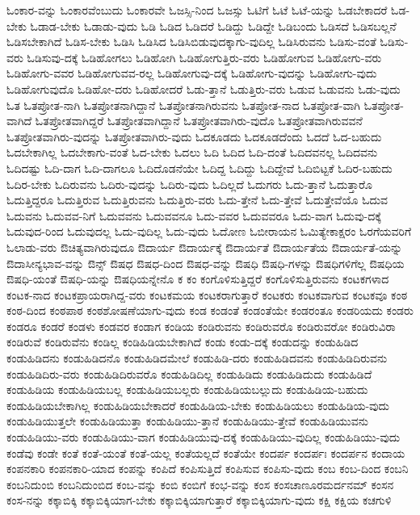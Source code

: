 {ಓಂಕಾರ-ವನ್ನು
ಓಂಕಾರವೆಂಬುದು
ಓಂಕಾರವೇ
ಓಜಸ್ಸಿ-ನಿಂದ
ಓಜಸ್ಸು
ಓಟಿಗೆ
ಓಟೆ
ಓಟೆ-ಯನ್ನು
ಓಡಬೇಕಾದರೆ
ಓಡ-ಬೇಕು
ಓಡಾಡ-ಬೇಕು
ಓಡಾಡು-ವುದು
ಓಡಿ
ಓಡಿದ
ಓಡಿದರೆ
ಓಡಿದ್ದು
ಓಡಿದ್ದೇ
ಓಡಿಬಂದು
ಓಡಿಸದೆ
ಓಡಿಸಬಲ್ಲನೆ
ಓಡಿಸಬೇಕಾಗಿದೆ
ಓಡಿಸ-ಬೇಕು
ಓಡಿಸಿ
ಓಡಿಸಿದ
ಓಡಿಸಿಬಿಡುವುದಕ್ಕಾಗು-ವುದಿಲ್ಲ
ಓಡಿಸಿರುವನು
ಓಡಿಸು-ವಂತೆ
ಓಡಿಸು-ವರು
ಓಡಿಸುವು-ದಕ್ಕೆ
ಓಡಿಹೋಗಲು
ಓಡಿಹೋಗಿ
ಓಡಿಹೋಗುತ್ತಿರು-ವರು
ಓಡಿಹೋಗುವ
ಓಡಿಹೋಗು-ವರು
ಓಡಿಹೋಗು-ವವರ
ಓಡಿಹೋಗುವವ-ರಲ್ಲ
ಓಡಿಹೋಗುವು-ದಕ್ಕೆ
ಓಡಿಹೋಗು-ವುದನ್ನು
ಓಡಿಹೋಗು-ವುದು
ಓಡಿಹೋಗುವುದೊ
ಓಡಿಹೋ-ದರು
ಓಡಿಹೋದರೆ
ಓಡು-ತ್ತಾನೆ
ಓಡುತ್ತಿರು-ವರು
ಓಡುವ
ಓಡುವನು
ಓಡು-ವುದು
ಓತ
ಓತಪ್ರೋತ-ನಾಗಿ
ಓತಪ್ರೋತನಾಗಿದ್ದಾನೆ
ಓತಪ್ರೋತನಾಗಿರುವನು
ಓತಪ್ರೋತ-ನಾದ
ಓತಪ್ರೋತ-ವಾಗಿ
ಓತಪ್ರೋತ-ವಾಗಿದೆ
ಓತಪ್ರೋತವಾಗಿದ್ದರೆ
ಓತಪ್ರೋತವಾಗಿದ್ದಾನೆ
ಓತಪ್ರೋತವಾಗಿರು-ವುದೊ
ಓತಪ್ರೋತವಾಗಿರುವವನೆ
ಓತಪ್ರೋತವಾಗಿರು-ವುದನ್ನು
ಓತಪ್ರೋತವಾಗಿರು-ವುದು
ಓದಕೂಡದು
ಓದಕೂಡದೆಂದು
ಓದದೆ
ಓದ-ಬಹುದು
ಓದಬೇಕಾಗಿಲ್ಲ
ಓದಬೇಕಾಗು-ವಂತೆ
ಓದ-ಬೇಕು
ಓದಲು
ಓದಿ
ಓದಿದ
ಓದಿ-ದಂತೆ
ಓದಿದವನಲ್ಲ
ಓದಿದವನು
ಓದಿದಷ್ಟು
ಓದಿ-ದಾಗ
ಓದಿ-ದಾಗಲೂ
ಓದಿದೊಡನೆಯೇ
ಓದಿದ್ದ
ಓದಿದ್ದು
ಓದಿದ್ದೇವೆ
ಓದಿಬಿಟ್ಟಕೆ
ಓದಿರ-ಬಹುದು
ಓದಿರ-ಬೇಕು
ಓದಿರುವನು
ಓದಿರು-ವುದನ್ನು
ಓದಿರು-ವುದು
ಓದಿಲ್ಲದೆ
ಓದುಗರು
ಓದು-ತ್ತಾನೆ
ಓದುತ್ತಾರೊ
ಓದುತ್ತಿದ್ದರೂ
ಓದುತ್ತಿರುವ
ಓದುತ್ತಿರುವನು
ಓದುತ್ತಿರು-ವರು
ಓದು-ತ್ತೇನೆ
ಓದು-ತ್ತೇವೆ
ಓದುತ್ತೇವೆಯೊ
ಓದುವ
ಓದುವನು
ಓದುವವ-ನಿಗೆ
ಓದುವವನು
ಓದುವವನೂ
ಓದು-ವವರ
ಓದುವವರೂ
ಓದು-ವಾಗ
ಓದುವು-ದಕ್ಕೆ
ಓದುವುದ-ರಿಂದ
ಓದುವುದಲ್ಲ
ಓದು-ವುದಿಲ್ಲ
ಓದು-ವುದು
ಓದೋಣ
ಓಬೀರಾಯನ
ಓಮಿತ್ಯೇಕಾಕ್ಷರಂ
ಓರಗೆಯವರಿಗೆ
ಓಲಾಡು-ವರು
ಔಚಿತ್ಯವಾಗಿರುವುದೂ
ಔದಾರ್ಯ
ಔದಾರ್ಯಕ್ಕೆ
ಔದಾರ್ಯತೆ
ಔದಾರ್ಯತೆಯ
ಔದಾರ್ಯತೆ-ಯನ್ನು
ಔದಾಸೀನ್ಯಭಾವ-ವನ್ನು
ಔನ್ಸ್
ಔಷಧ
ಔಷಧ-ದಿಂದ
ಔಷಧ-ವನ್ನು
ಔಷಧಿ
ಔಷಧಿ-ಗಳನ್ನು
ಔಷಧಿಗಳಿಗೆಲ್ಲ
ಔಷಧಿಯ
ಔಷಧಿ-ಯಂತೆ
ಔಷಧಿ-ಯನ್ನು
ಔಷಧಿಯನ್ನೇನೊ
ಕ
ಕಂ
ಕಂಗೊಳಿಸುತ್ತಿದ್ದರೆ
ಕಂಗೊಳಿಸುತ್ತಿರುವನು
ಕಂಟಕಗಳಾದ
ಕಂಟಕ-ನಾದ
ಕಂಟಕಪ್ರಾಯರಾಗಿದ್ದ-ವರು
ಕಂಟಕಮಯ
ಕಂಟಕರಾಗುತ್ತಾರೆ
ಕಂಟಕರು
ಕಂಟಕವಾಗುವ
ಕಂಟಕವೂ
ಕಂಠ
ಕಂಠ-ದಿಂದ
ಕಂಠಪಾಠ
ಕಂಠಶೋಷಣೆಯಾಗು-ವುದು
ಕಂಡ
ಕಂಡಂತೆ
ಕಂಡಂತೆಯೇ
ಕಂಡರಂತೂ
ಕಂಡರಿಯದು
ಕಂಡರು
ಕಂಡರೂ
ಕಂಡರೆ
ಕಂಡಳು
ಕಂಡವರ
ಕಂಡಾಗ
ಕಂಡಿಯ
ಕಂಡಿರುವನು
ಕಂಡಿರುವರೊ
ಕಂಡಿರುವರೋ
ಕಂಡಿರುವಿರಾ
ಕಂಡಿರುವೆ
ಕಂಡಿರುವೆನು
ಕಂಡಿಲ್ಲ
ಕಂಡಿಹಿಡಿಯಬೇಕಾಗಿದೆ
ಕಂಡು
ಕಂಡು-ದಕ್ಕೆ
ಕಂಡುದನ್ನು
ಕಂಡುಹಿಡಿದ
ಕಂಡುಹಿಡಿದನು
ಕಂಡುಹಿಡಿದನೊ
ಕಂಡುಹಿಡಿದಮೇಲೆ
ಕಂಡುಹಿಡಿ-ದರು
ಕಂಡುಹಿಡಿದವನು
ಕಂಡುಹಿಡಿದಿರುವನು
ಕಂಡುಹಿಡಿದಿರು-ವರು
ಕಂಡುಹಿಡಿದಿರುವರೊ
ಕಂಡುಹಿಡಿದಿಲ್ಲ
ಕಂಡುಹಿಡಿದು
ಕಂಡುಹಿಡಿದುದು
ಕಂಡುಹಿಡಿದೆ
ಕಂಡುಹಿಡಿಯ
ಕಂಡುಹಿಡಿಯಬಲ್ಲ
ಕಂಡುಹಿಡಿಯಬಲ್ಲರು
ಕಂಡುಹಿಡಿಯಬಲ್ಲುದು
ಕಂಡುಹಿಡಿಯ-ಬಹುದು
ಕಂಡುಹಿಡಿಯಬೇಕಾಗಿಲ್ಲ
ಕಂಡುಹಿಡಿಯಬೇಕಾದರೆ
ಕಂಡುಹಿಡಿಯ-ಬೇಕು
ಕಂಡುಹಿಡಿಯಲು
ಕಂಡುಹಿಡಿಯ-ವುದು
ಕಂಡುಹಿಡಿಯುತ್ತಲೇ
ಕಂಡುಹಿಡಿಯುತ್ತಾ
ಕಂಡುಹಿಡಿಯು-ತ್ತಾನೆ
ಕಂಡುಹಿಡಿಯು-ತ್ತೇವೆ
ಕಂಡುಹಿಡಿಯುವನು
ಕಂಡುಹಿಡಿಯು-ವರು
ಕಂಡುಹಿಡಿಯು-ವಾಗ
ಕಂಡುಹಿಡಿಯುವು-ದಕ್ಕೆ
ಕಂಡುಹಿಡಿಯು-ವುದಿಲ್ಲ
ಕಂಡುಹಿಡಿಯು-ವುದು
ಕಂಡೆವು
ಕಂಡೇ
ಕಂತೆ
ಕಂತೆ-ಯಂತೆ
ಕಂತೆ-ಯಲ್ಲ
ಕಂತೆಯಲ್ಲದೆ
ಕಂತೆಯೇ
ಕಂದರ್ಪ
ಕಂದರ್ಪಃ
ಕಂದರ್ಪನ
ಕಂದಾಯ
ಕಂಪನಕಾರಿ
ಕಂಪನಕಾರಿ-ಯಾದ
ಕಂಪನ್ನು
ಕಂಪಿದೆ
ಕಂಪಿಸುತ್ತಿದೆ
ಕಂಪಿಸುವ
ಕಂಪಿಸು-ವುದು
ಕಂಬ
ಕಂಬ-ದಿಂದ
ಕಂಬನಿ
ಕಂಬನಿದುಂಬಿ
ಕಂಬನಿದುಂಬಿದ
ಕಂಬ-ವನ್ನು
ಕಂಬಿ
ಕಂಬಿಗೆ
ಕಂಭ-ವನ್ನು
ಕಂಸ
ಕಂಸಚಾಣೂರಮರ್ದನಮ್
ಕಂಸನ
ಕಂಸ-ನನ್ನು
ಕಕ್ಕಾಬಿಕ್ಕಿ
ಕಕ್ಕಾಬಿಕ್ಕಿಯಾಗ-ಬೇಕು
ಕಕ್ಕಾಬಿಕ್ಕಿಯಾಗುತ್ತಾರೆ
ಕಕ್ಕಾಬಿಕ್ಕಿಯಾಗು-ವುದು
ಕಕ್ಷಿ
ಕಕ್ಷಿಯ
ಕಚಗುಳಿ
}
